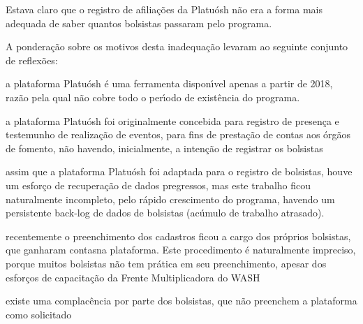 \documentclass[
12pt,		%
openright,	%
twoside,  %
a4paper,			%
chapter=TITLE,		%
english,			%
french,				%
spanish,			%
brazil				%
]{USPSC-classe/USPSC}
\begin{document}
Estava claro que o registro de afilia\c{c}\~oes da Platu\'osh n\~ao era a forma mais adequada de saber quantos bolsistas passaram pelo programa.



































A pondera\c{c}\~ao sobre os motivos desta inadequa\c{c}\~ao levaram ao seguinte conjunto de reflex\~oes:


















\begin{alineas}
\item a plataforma Platu\'osh \'e uma ferramenta dispon\'{\i}vel apenas a partir de 2018, raz\~ao pela qual n\~ao cobre todo o per\'{\i}odo de exist\^encia do programa.
\item a plataforma Platu\'osh foi originalmente concebida para registro de presen\c{c}a e testemunho de realiza\c{c}\~ao de eventos, para fins de presta\c{c}\~ao de contas aos \'org\~aos de fomento, n\~ao havendo, inicialmente, a inten\c{c}\~ao de registrar os bolsistas
\item assim que a plataforma Platu\'osh foi adaptada para o registro de bolsistas, houve um esfor\c{c}o de recupera\c{c}\~ao de dados pregressos, mas este trabalho ficou naturalmente incompleto, pelo r\'apido crescimento do programa, havendo um persistente back-log de dados de bolsistas (ac\'umulo de trabalho atrasado).
\item recentemente o preenchimento dos cadastros ficou a cargo dos pr\'oprios bolsistas, que ganharam \textquotedbl contas\textquotedbl  na plataforma. Este procedimento \'e naturalmente impreciso, porque muitos bolsistas n\~ao tem pr\'atica em seu preenchimento, apesar dos esfor\c{c}os de capacita\c{c}\~ao da Frente Multiplicadora do WASH
\item existe uma complac\^encia por parte dos bolsistas, que n\~ao preenchem a plataforma como solicitado
\end{alineas}
\end{document}
